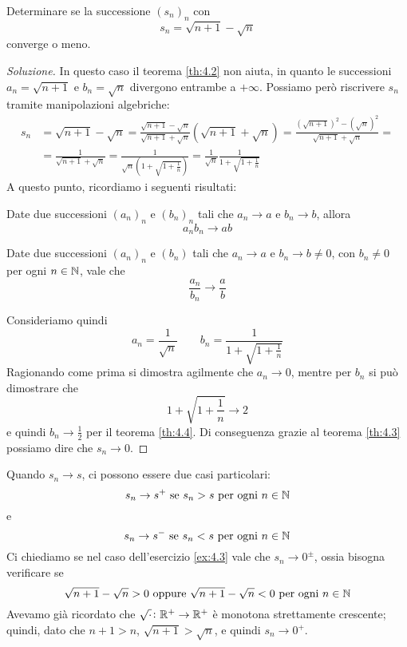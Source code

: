\begin{exercise}
    \label{ex:4.3}
    Determinare se la successione $(s_n)_n$ con
    \[
    s_n = \sqrt{n+1}-\sqrt{n}
    \]
    converge o meno.
\end{exercise}
\begin{proof}[Soluzione]
    In questo caso il teorema \ref{th:4.2} non aiuta, in quanto le successioni $a_n = \sqrt{n+1}$ e $b_n = \sqrt{n}$ divergono entrambe a $+\infty$. Possiamo però riscrivere $s_n$ tramite manipolazioni algebriche:
    \[
    \begin{split}
        s_n & = \sqrt{n+1}-\sqrt{n} = \frac{\sqrt{n+1}-\sqrt{n}}{\sqrt{n+1}+\sqrt{n}}(\sqrt{n+1}+\sqrt{n}) = \frac{(\sqrt{n+1})^2 - (\sqrt{n})^2}{\sqrt{n+1}+\sqrt{n}} = \\
        & = \frac{1}{\sqrt{n+1}+\sqrt{n}} = \frac{1}{\sqrt{n}\left(1+\sqrt{1+\frac{1}{n}}\right)} = \frac{1}{\sqrt{n}}\frac{1}{1+\sqrt{1+\frac{1}{n}}}
    \end{split}
    \]
    A questo punto, ricordiamo i seguenti risultati:
    \begin{tcolorbox}
        \begin{theorem}
            \label{th:4.3}
            Date due successioni $(a_n)_n$ e $(b_n)_n$ tali che $a_n \to a$ e $b_n\to b$, allora
            \[
            a_nb_n \to ab
            \]
        \end{theorem}
    \end{tcolorbox}
    \begin{tcolorbox}
        \begin{theorem}
            \label{th:4.4}
            Date due successioni $(a_n)_n$ e $(b_n)$ tali che $a_n \to a$ e $b_n\to b\ne 0$, con $b_n \ne 0$ per ogni $n\in\amsbb{N}$, vale che
            \[
            \frac{a_n}{b_n}\to \frac{a}{b}
            \]
        \end{theorem}
    \end{tcolorbox}
    Consideriamo quindi
    \[
    a_n = \frac{1}{\sqrt{n}} \qquad b_n=\frac{1}{1+\sqrt{1+\frac{1}{n}}}
    \]
    Ragionando come prima si dimostra agilmente che $a_n\to 0$, mentre per $b_n$ si può dimostrare che 
    \[
    1+\sqrt{1+\frac{1}{n}}\to 2
    \]
    e quindi $b_n \to \frac{1}{2}$ per il teorema \ref{th:4.4}. Di conseguenza grazie al teorema \ref{th:4.3} possiamo dire che $s_n \to 0$.
\end{proof}
\begin{remark}
    Quando $s_n \to s$, ci possono essere due casi particolari:
    \[
    s_n \to s^+ \ \text{se} \ s_n>s \ \text{per ogni} \ n\in\amsbb{N}
    \]
    e
    \[
    s_n \to s^- \ \text{se} \ s_n<s \ \text{per ogni} \ n\in\amsbb{N}
    \]
    Ci chiediamo se nel caso dell'esercizio \ref{ex:4.3} vale che $s_n \to 0^\pm$, ossia bisogna verificare se
    \[
    \sqrt{n+1}-\sqrt{n}>0 \ \text{oppure} \ \sqrt{n+1}-\sqrt{n}<0 \ \text{per ogni} \ n\in\amsbb{N}
    \]
    Avevamo già ricordato che $\sqrt{\cdot}\colon\amsbb{R}^+ \to \amsbb{R}^+$ è monotona strettamente crescente; quindi, dato che $n+1>n$, $\sqrt{n+1}>\sqrt{n}$, e quindi $s_n \to 0^+$.
\end{remark}
